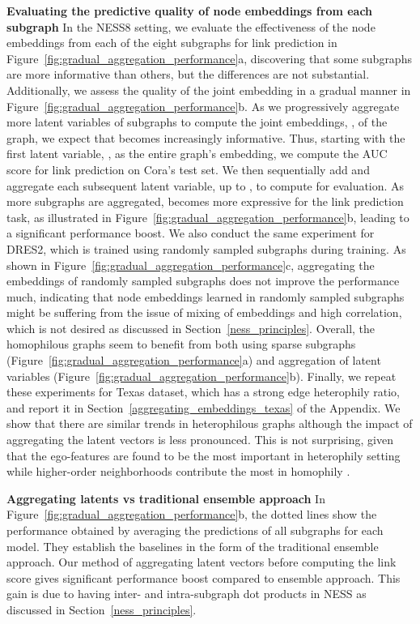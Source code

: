 \documentclass{article}
\begin{document}
\textbf{Evaluating the predictive quality of node embeddings from each subgraph} In the NESS8 setting, we evaluate the effectiveness of the node embeddings from each of the eight subgraphs for link prediction in Figure~\ref{fig:gradual_aggregation_performance}a, discovering that some subgraphs are more informative than others, but the differences are not substantial. Additionally, we assess the quality of the joint embedding in a gradual manner in Figure~\ref{fig:gradual_aggregation_performance}b. As we progressively aggregate more latent variables of subgraphs to compute the joint embeddings, , of the graph, we expect that  becomes increasingly informative. Thus, starting with the first latent variable, {}, as the entire graph's embedding, we compute the AUC score for link prediction on Cora's test set. We then sequentially add and aggregate each subsequent latent variable, up to , to compute  for evaluation. As more subgraphs are aggregated,  becomes more expressive for the link prediction task, as illustrated in Figure~\ref{fig:gradual_aggregation_performance}b, leading to a significant performance boost.
We also conduct the same experiment for DRES2, which is trained using randomly sampled subgraphs during training. As shown in Figure~\ref{fig:gradual_aggregation_performance}c, aggregating the embeddings of randomly sampled subgraphs does not improve the performance much, indicating that node embeddings learned in randomly sampled subgraphs might be suffering from the issue of mixing of embeddings and high correlation, which is not desired as discussed in Section~\ref{ness_principles}. Overall, the homophilous graphs seem to benefit from both using sparse subgraphs (Figure~\ref{fig:gradual_aggregation_performance}a) and aggregation of latent variables (Figure~\ref{fig:gradual_aggregation_performance}b). Finally, we repeat these experiments for Texas dataset, which has a strong edge heterophily ratio, and report it in Section~\ref{aggregating_embeddings_texas} of the Appendix. We show that there are similar trends in heterophilous graphs although the impact of aggregating the latent vectors is less pronounced. This is not surprising, given that the ego-features are found to be the most important in heterophily setting while higher-order neighborhoods contribute the most in homophily \citep{zhu2020beyond}.

\textbf{Aggregating latents vs traditional ensemble approach} In Figure~\ref{fig:gradual_aggregation_performance}b, the dotted lines show the performance obtained by averaging the predictions of all subgraphs for each model. They establish the baselines in the form of the traditional ensemble approach. Our method of aggregating latent vectors before computing the link score gives significant performance boost compared to ensemble approach. This gain is due to having inter- and intra-subgraph dot products in NESS as discussed in Section~\ref{ness_principles}. 
\end{document}
